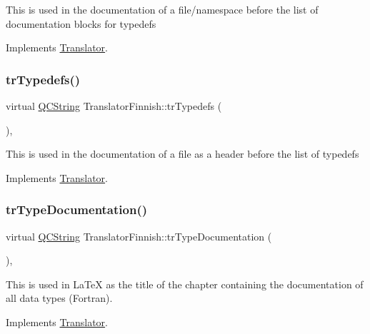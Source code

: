 This is used in the documentation of a file/namespace before the list of documentation blocks for typedefs 

Implements \mbox{\hyperlink{class_translator}{Translator}}.

\mbox{\label{class_translator_finnish_acb2ce70d8c20d6c2f292255cbc3fdd90}} 
\subsubsection{\texorpdfstring{trTypedefs()}{trTypedefs()}}
{\footnotesize\ttfamily virtual \mbox{\hyperlink{class_q_c_string}{Q\+C\+String}} Translator\+Finnish\+::tr\+Typedefs (\begin{DoxyParamCaption}{ }\end{DoxyParamCaption})\hspace{0.3cm}{\ttfamily [inline]}, {\ttfamily [virtual]}}

This is used in the documentation of a file as a header before the list of typedefs 

Implements \mbox{\hyperlink{class_translator}{Translator}}.

\mbox{\label{class_translator_finnish_ac926b87529eb620a61ccc4b7cb7859d5}} 
\subsubsection{\texorpdfstring{trTypeDocumentation()}{trTypeDocumentation()}}
{\footnotesize\ttfamily virtual \mbox{\hyperlink{class_q_c_string}{Q\+C\+String}} Translator\+Finnish\+::tr\+Type\+Documentation (\begin{DoxyParamCaption}{ }\end{DoxyParamCaption})\hspace{0.3cm}{\ttfamily [inline]}, {\ttfamily [virtual]}}

This is used in La\+TeX as the title of the chapter containing the documentation of all data types (Fortran). 

Implements \mbox{\hyperlink{class_translator}{Translator}}.

\mbox{\label{class_translator_finnish_a4fdc2bbe460372427169a85bc9d02772}} 
